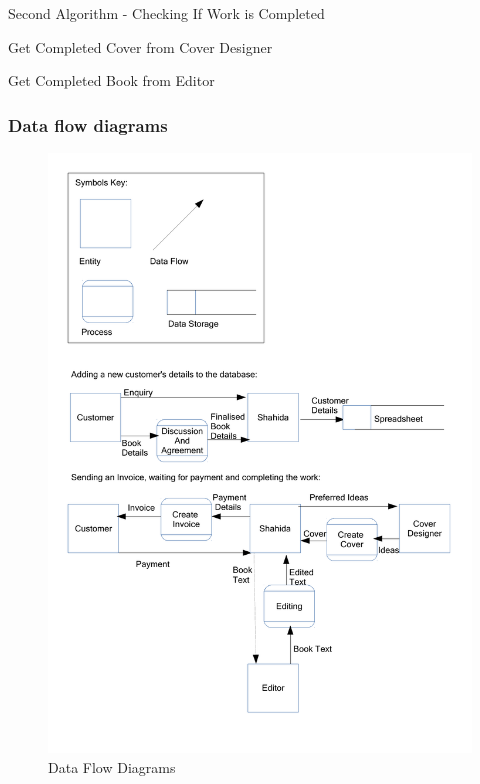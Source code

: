 \begin{algorithm}[H]
    \caption{Second Algorithm - Checking If Work is Completed}
\begin{algorithmic}[1]
\State

    
    Get Completed Cover from Cover Designer


    Get Completed Book from Editor




    \EndIf
\EndWhile
\end{algorithmic}
\end{algorithm}

\subsubsection{Data flow diagrams}

\begin{figure}[H]
    \includegraphics[width=\textwidth]{./Analysis/Data_Flow_Diagrams_1.pdf}
    \caption{Data Flow Diagrams} \label{Data_Flow_Diagrams_1.pdf}
\end{figure}

